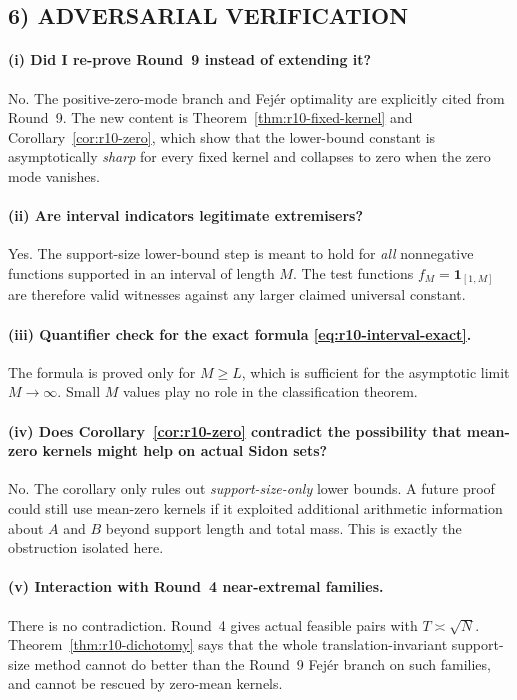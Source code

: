\subsection{6) ADVERSARIAL VERIFICATION}

\paragraph{(i) Did I re-prove Round~9 instead of extending it?}
No. The positive-zero-mode branch and Fej\'er optimality are explicitly cited from Round~9. The new content is Theorem~\ref{thm:r10-fixed-kernel} and Corollary~\ref{cor:r10-zero}, which show that the lower-bound constant is asymptotically \emph{sharp} for every fixed kernel and collapses to zero when the zero mode vanishes.

\paragraph{(ii) Are interval indicators legitimate extremisers?}
Yes. The support-size lower-bound step is meant to hold for \emph{all} nonnegative functions supported in an interval of length \(M\). The test functions \(f_M=\mathbf 1_{[1,M]}\) are therefore valid witnesses against any larger claimed universal constant.

\paragraph{(iii) Quantifier check for the exact formula \eqref{eq:r10-interval-exact}.}
The formula is proved only for \(M\ge L\), which is sufficient for the asymptotic limit \(M\to\infty\). Small \(M\) values play no role in the classification theorem.

\paragraph{(iv) Does Corollary~\ref{cor:r10-zero} contradict the possibility that mean-zero kernels might help on actual Sidon sets?}
No. The corollary only rules out \emph{support-size-only} lower bounds. A future proof could still use mean-zero kernels if it exploited additional arithmetic information about \(A\) and \(B\) beyond support length and total mass. This is exactly the obstruction isolated here.

\paragraph{(v) Interaction with Round~4 near-extremal families.}
There is no contradiction. Round~4 gives actual feasible pairs with \(T\asymp \sqrt N\). Theorem~\ref{thm:r10-dichotomy} says that the whole translation-invariant support-size method cannot do better than the Round~9 Fej\'er branch on such families, and cannot be rescued by zero-mean kernels.


